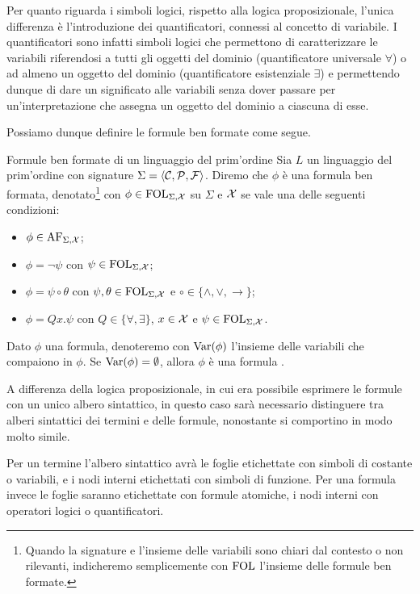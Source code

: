 Per quanto riguarda i simboli logici, rispetto alla logica proposizionale, l'unica differenza è l'introduzione dei quantificatori, connessi al concetto di variabile. I quantificatori sono infatti simboli logici che permettono di caratterizzare le variabili riferendosi a tutti gli oggetti del dominio (quantificatore universale \(\forall\)) o ad almeno un oggetto del dominio (quantificatore esistenziale \(\exists\)) e permettendo dunque di dare un significato alle variabili senza dover passare per un'interpretazione che assegna un oggetto del dominio a ciascuna di esse.

Possiamo dunque definire le formule ben formate come segue.
\begin{definition}{Formule ben formate di un linguaggio del prim'ordine}
  Sia \(L\) un linguaggio del prim'ordine con signature \(\Sigma = \langle \mathcal{C}, \mathcal{P}, \mathcal{F} \rangle\). Diremo che \(\phi\) è una formula ben formata, denotato\footnote{Quando la signature e l'insieme delle variabili sono chiari dal contesto o non rilevanti, indicheremo semplicemente con \(\FOL\) l'insieme delle formule ben formate.} con \(\phi \in \FOL[\Sigma,\VarSyms]\) su \(\Sigma\) e \(\mathcal{X}\) se vale una delle seguenti condizioni:
  \begin{itemize}
    \item \(\phi\in\AF[\Sigma,\VarSyms]\);
    \item \(\phi = \neg\psi\) con \(\psi\in\FOL[\Sigma,\VarSyms]\);
    \item \(\phi = \psi\circ\theta\) con \(\psi,\theta\in\FOL[\Sigma,\VarSyms]\) e \(\circ\in\{\land,\lor,\to\}\);
    \item \(\phi = Qx.\psi\) con \(Q\in\{\forall,\exists\}\), \(x\in\mathcal{X}\) e \(\psi\in\FOL[\Sigma,\VarSyms]\).
  \end{itemize}

  Dato \(\phi\) una formula, denoteremo con \(\operatorname{Var}(\phi)\) l'insieme delle variabili che compaiono in \(\phi\). Se \(\operatorname{Var}(\phi)=\emptyset\), allora \(\phi\) è una formula .
\end{definition}

A differenza della logica proposizionale, in cui era possibile esprimere le formule con un unico albero sintattico, in questo caso sarà necessario distinguere tra alberi sintattici dei termini e delle formule, nonostante si comportino in modo molto simile.

Per un termine l'albero sintattico avrà le foglie etichettate con simboli di costante o variabili, e i nodi interni etichettati con simboli di funzione. Per una formula invece le foglie saranno etichettate con formule atomiche, i nodi interni con operatori logici o quantificatori.

